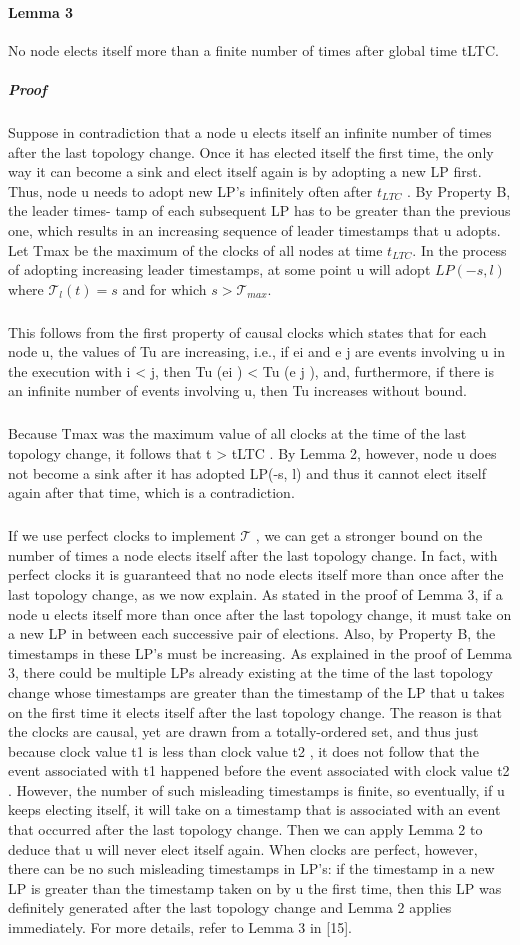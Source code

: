 \paragraph{Lemma 3}No node elects itself more than a finite number of times after global time tLTC.
\subparagraph{Proof}Suppose in contradiction that a node u elects itself an infinite number of times after the last topology change. Once it has elected itself the first time, the only way it can become a sink and elect itself again is by adopting a new LP first. Thus, node u needs to adopt new LP's infinitely often after $t_{LTC}$ . By Property B, the leader times- tamp of each subsequent LP has to be greater than the previous one, which results in an increasing sequence of leader timestamps that u adopts. Let Tmax be the maximum of the clocks of all nodes at time $t_{LTC}$. In the process of adopting increasing leader timestamps, at some point u will adopt $LP(-s, l)$ where $\mathcal{T} _l (t) = s$ and for which $s > \mathcal{T} _{max}$.
\subparagraph{}This follows from the first property of causal clocks which states that for each node u, the values of Tu are increasing, i.e., if ei and e j are events involving u in the execution with i < j, then Tu (ei ) < Tu (e j ), and, furthermore, if there is an infinite number of events involving u, then Tu increases without bound. 
\subparagraph{}Because Tmax was the maximum value of all clocks at the time of the last topology change, it follows that t > tLTC . By Lemma 2, however, node u does not become a sink after it has adopted LP(-s, l) and thus it cannot elect itself again after that time, which is a contradiction.
\subparagraph{}If we use perfect clocks to implement $\mathcal{T}$ , we can get a stronger bound on the number of times a node elects itself after the last topology change. In fact, with perfect clocks it is guaranteed that no node elects itself more than once after the last topology change, as we now explain. As stated in the proof of Lemma 3, if a node u elects itself more than once after the last topology change, it must take on a new LP in between each successive pair of elections. Also, by Property B, the timestamps in these LP's must be increasing. As explained in the proof of Lemma 3, there could be multiple LPs already existing at the time of the last topology change whose timestamps are greater than the timestamp of the LP that u takes on the first time it elects itself after the last topology change. The reason is that the clocks are causal, yet are drawn from a totally-ordered set, and thus just because clock value t1 is less than clock value t2 , it does not follow that the event associated with t1 happened before the event associated with clock value t2 . However, the number of such misleading timestamps is finite, so eventually, if u keeps electing itself, it will take on a timestamp that is associated with an event that occurred after the last topology change. Then we can apply Lemma 2 to deduce that u will never elect itself again. When clocks are perfect, however, there can be no such misleading timestamps in LP's: if the timestamp in a new LP is greater than the timestamp taken on by u the first time, then this LP was definitely generated after the last topology change and Lemma 2 applies immediately. For more details, refer to Lemma 3 in [15].
